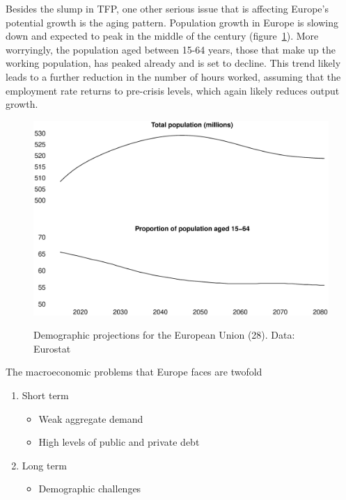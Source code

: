 \documentclass{tufte-handout}
\begin{document}
Besides the slump in TFP, one other serious issue that is affecting Europe's potential growth is the aging pattern. 
Population growth in Europe is slowing down and expected to peak in the middle of the century (figure~\ref{fig:population}).
More worryingly, the population aged between 15-64 years, those that make up the working population, has peaked already and is set to decline. 
This trend likely leads to a further reduction in the number of hours worked, assuming that the employment rate returns to pre-crisis levels, which again likely reduces output growth.
\begin{figure}
  \includegraphics[scale=.3]{population}
  \label{fig:population}
  \caption{Demographic projections for the European Union (28). Data: Eurostat}
\end{figure}
\newline
The macroeconomic problems that Europe faces are twofold
\begin{enumerate}
  \item Short term
  \begin{itemize}
    \item Weak aggregate demand
    \item High levels of public and private debt
  \end{itemize}
  \item Long term
  \begin{itemize}
    \item Demographic challenges  
  \end{itemize}    
\end{enumerate}
\end{document}
